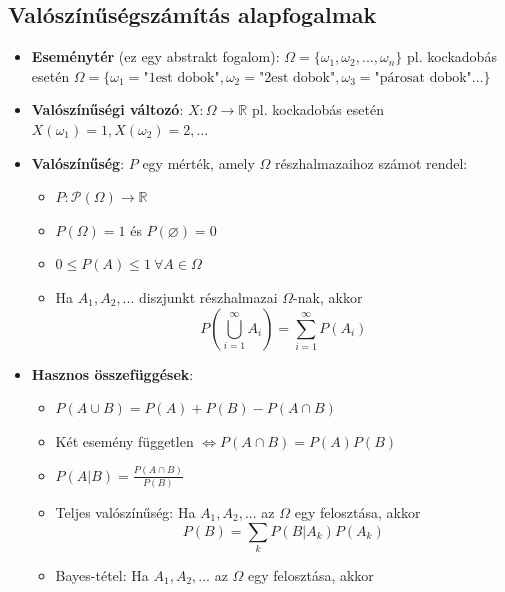\documentclass[12pt]{article}
\theoremstyle{plain}
\begin{document}
\subsection{Valószínűségszámítás alapfogalmak}
\begin{itemize}
    \item \textbf{Eseménytér} (ez egy abstrakt fogalom): $\Omega = \{\omega_1, \omega_2, ..., \omega_n\}$ pl. kockadobás esetén $\Omega = \{ \omega_1=\text{"1est dobok"}, \omega_2=\text{"2est dobok"}, \omega_3=\text{"párosat dobok"} ... \}$
    \item \textbf{Valószínűségi változó}: $X:\Omega \rightarrow \mathbb R$ pl. kockadobás esetén $X(\omega_1) = 1, X(\omega_2) = 2, ... $
    \item \textbf{Valószínűség}: $P$ egy mérték, amely $\Omega$ részhalmazaihoz számot rendel:
        \begin{itemize}
            \item $P: \mathcal{P}(\Omega) \rightarrow \mathbb R$
            \item $P(\Omega) = 1$ és $P(\varnothing) = 0$
            \item $ 0 \leq P(A) \leq 1 ~ \forall A \in \Omega$
            \item Ha $A_1, A_2, ...$ diszjunkt részhalmazai $\Omega$-nak, akkor 
            \begin{equation*}
                P\left(\bigcup\limits_{i=1}^{\infty}A_i\right) = \sum\limits_{i=1}^{\infty}P(A_i)
            \end{equation*}
        \end{itemize}
    \item \textbf{Hasznos összefüggések}:
        \begin{itemize}
            \item $P(A\cup B) = P(A)+P(B)-P(A\cap B)$
            \item Két esemény független $\Longleftrightarrow P(A\cap B) = P(A)P(B)$
            \item $P(A|B) = \frac{P(A\cap B)}{P(B)}$
            \item Teljes valószínűség: Ha $A_1, A_2, ...$ az $\Omega$ egy felosztása, akkor 
                \begin{equation*}
                    P(B) = \sum\limits_{k} P(B|A_k)P(A_k)
                \end{equation*}
            \item Bayes-tétel: Ha $A_1, A_2, ...$ az $\Omega$ egy felosztása, akkor 
                \begin{equation*}

\end{equation*}
\end{itemize}
\end{itemize}
\end{document}
